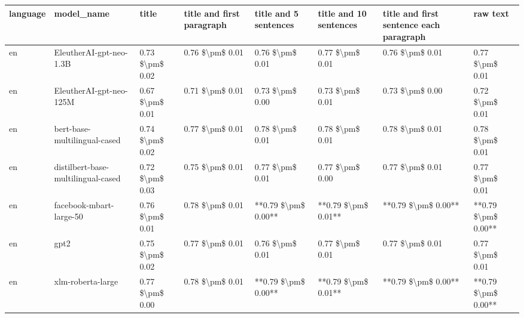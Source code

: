 \begin{tabular}{llllllll}
\toprule
language &                         model\_name &           title & title and first paragraph & title and 5 sentences & title and 10 sentences & title and first sentence each paragraph &            raw text \\
\midrule
      en &            EleutherAI-gpt-neo-1.3B & 0.73 \$\textbackslash pm\$ 0.02 &           0.76 \$\textbackslash pm\$ 0.01 &       0.76 \$\textbackslash pm\$ 0.01 &        0.77 \$\textbackslash pm\$ 0.01 &                         0.76 \$\textbackslash pm\$ 0.01 &     0.77 \$\textbackslash pm\$ 0.01 \\
      en &            EleutherAI-gpt-neo-125M & 0.67 \$\textbackslash pm\$ 0.01 &           0.71 \$\textbackslash pm\$ 0.01 &       0.73 \$\textbackslash pm\$ 0.00 &        0.73 \$\textbackslash pm\$ 0.01 &                         0.73 \$\textbackslash pm\$ 0.00 &     0.72 \$\textbackslash pm\$ 0.01 \\
      en &       bert-base-multilingual-cased & 0.74 \$\textbackslash pm\$ 0.02 &           0.77 \$\textbackslash pm\$ 0.01 &       0.78 \$\textbackslash pm\$ 0.01 &        0.78 \$\textbackslash pm\$ 0.01 &                         0.78 \$\textbackslash pm\$ 0.01 &     0.78 \$\textbackslash pm\$ 0.01 \\
      en & distilbert-base-multilingual-cased & 0.72 \$\textbackslash pm\$ 0.03 &           0.75 \$\textbackslash pm\$ 0.01 &       0.77 \$\textbackslash pm\$ 0.01 &        0.77 \$\textbackslash pm\$ 0.00 &                         0.77 \$\textbackslash pm\$ 0.01 &     0.77 \$\textbackslash pm\$ 0.01 \\
      en &            facebook-mbart-large-50 & 0.76 \$\textbackslash pm\$ 0.01 &           0.78 \$\textbackslash pm\$ 0.01 &   **0.79 \$\textbackslash pm\$ 0.00** &    **0.79 \$\textbackslash pm\$ 0.01** &                     **0.79 \$\textbackslash pm\$ 0.00** & **0.79 \$\textbackslash pm\$ 0.00** \\
      en &                               gpt2 & 0.75 \$\textbackslash pm\$ 0.02 &           0.77 \$\textbackslash pm\$ 0.01 &       0.76 \$\textbackslash pm\$ 0.01 &        0.77 \$\textbackslash pm\$ 0.01 &                         0.77 \$\textbackslash pm\$ 0.01 &     0.77 \$\textbackslash pm\$ 0.01 \\
      en &                  xlm-roberta-large & 0.77 \$\textbackslash pm\$ 0.00 &           0.78 \$\textbackslash pm\$ 0.01 &   **0.79 \$\textbackslash pm\$ 0.00** &    **0.79 \$\textbackslash pm\$ 0.01** &                     **0.79 \$\textbackslash pm\$ 0.00** & **0.79 \$\textbackslash pm\$ 0.00** \\

\end{tabular}
